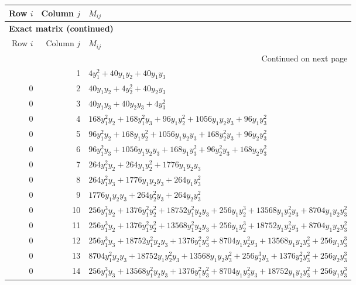 \documentclass[10pt,a4paper]{article}
\begin{document}
{\small\setlength{\tabcolsep}{7pt}\begin{longtable}{rrp{125mm}}
\toprule Row $i$ & Column $j$ & $M_{ij}$\\\midrule\endfirsthead
\multicolumn{3}{l}{\textbf{Exact matrix (continued)}}\\
\toprule Row $i$ & Column $j$ & $M_{ij}$\\\midrule\endhead
\midrule\multicolumn{3}{r}{Continued on next page}\\\endfoot\bottomrule\endlastfoot
0 & 1 & $4 y_{1}^{2} + 40 y_{1} y_{2} + 40 y_{1} y_{3}$\\
0 & 2 & $40 y_{1} y_{2} + 4 y_{2}^{2} + 40 y_{2} y_{3}$\\
0 & 3 & $40 y_{1} y_{3} + 40 y_{2} y_{3} + 4 y_{3}^{2}$\\
0 & 4 & $168 y_{1}^{2} y_{2} + 168 y_{1}^{2} y_{3} + 96 y_{1} y_{2}^{2} + 1056 y_{1} y_{2} y_{3} + 96 y_{1} y_{3}^{2}$\\
0 & 5 & $96 y_{1}^{2} y_{2} + 168 y_{1} y_{2}^{2} + 1056 y_{1} y_{2} y_{3} + 168 y_{2}^{2} y_{3} + 96 y_{2} y_{3}^{2}$\\
0 & 6 & $96 y_{1}^{2} y_{3} + 1056 y_{1} y_{2} y_{3} + 168 y_{1} y_{3}^{2} + 96 y_{2}^{2} y_{3} + 168 y_{2} y_{3}^{2}$\\
0 & 7 & $264 y_{1}^{2} y_{2} + 264 y_{1} y_{2}^{2} + 1776 y_{1} y_{2} y_{3}$\\
0 & 8 & $264 y_{1}^{2} y_{3} + 1776 y_{1} y_{2} y_{3} + 264 y_{1} y_{3}^{2}$\\
0 & 9 & $1776 y_{1} y_{2} y_{3} + 264 y_{2}^{2} y_{3} + 264 y_{2} y_{3}^{2}$\\
0 & 10 & $256 y_{1}^{3} y_{2} + 1376 y_{1}^{2} y_{2}^{2} + 18752 y_{1}^{2} y_{2} y_{3} + 256 y_{1} y_{2}^{3} + 13568 y_{1} y_{2}^{2} y_{3} + 8704 y_{1} y_{2} y_{3}^{2}$\\
0 & 11 & $256 y_{1}^{3} y_{2} + 1376 y_{1}^{2} y_{2}^{2} + 13568 y_{1}^{2} y_{2} y_{3} + 256 y_{1} y_{2}^{3} + 18752 y_{1} y_{2}^{2} y_{3} + 8704 y_{1} y_{2} y_{3}^{2}$\\
0 & 12 & $256 y_{1}^{3} y_{3} + 18752 y_{1}^{2} y_{2} y_{3} + 1376 y_{1}^{2} y_{3}^{2} + 8704 y_{1} y_{2}^{2} y_{3} + 13568 y_{1} y_{2} y_{3}^{2} + 256 y_{1} y_{3}^{3}$\\
0 & 13 & $8704 y_{1}^{2} y_{2} y_{3} + 18752 y_{1} y_{2}^{2} y_{3} + 13568 y_{1} y_{2} y_{3}^{2} + 256 y_{2}^{3} y_{3} + 1376 y_{2}^{2} y_{3}^{2} + 256 y_{2} y_{3}^{3}$\\
0 & 14 & $256 y_{1}^{3} y_{3} + 13568 y_{1}^{2} y_{2} y_{3} + 1376 y_{1}^{2} y_{3}^{2} + 8704 y_{1} y_{2}^{2} y_{3} + 18752 y_{1} y_{2} y_{3}^{2} + 256 y_{1} y_{3}^{3}$\\

\end{longtable}}
\end{document}
